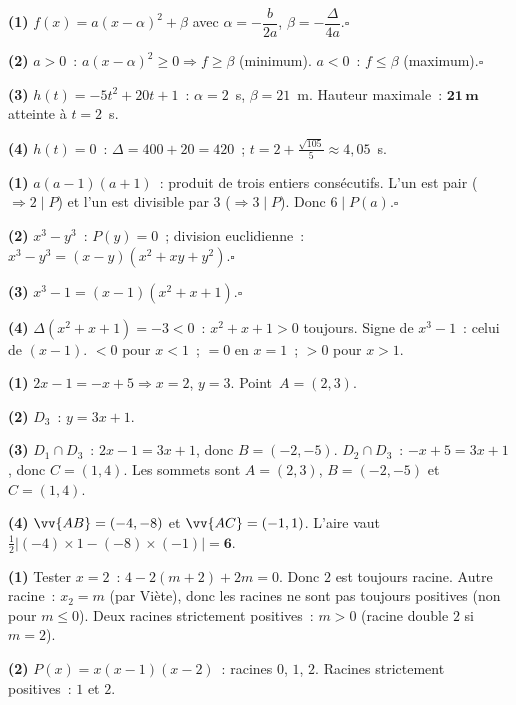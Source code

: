 \textbf{(1)} $f(x)=a(x-\alpha)^2+\beta$ avec $\alpha=-\dfrac{b}{2a}$, $\beta=-\dfrac{\Delta}{4a}$.\hfill$\square$

\textbf{(2)} $a>0$~: $a(x-\alpha)^2\geq0\Rightarrow f\geq\beta$ (minimum).
$a<0$~: $f\leq\beta$ (maximum).\hfill$\square$

\textbf{(3)} $h(t)=-5t^2+20t+1$~: $\alpha=2$~s, $\beta=21$~m.
Hauteur maximale~: $\mathbf{21\,\text{m}}$ atteinte \`a $t=2$~s.

\textbf{(4)} $h(t)=0$~: $\Delta=400+20=420$~;
$t=2+\tfrac{\sqrt{105}}{5}\approx4{,}05$~s.


\textbf{(1)} $a(a-1)(a+1)$~: produit de trois entiers cons\'ecutifs.
L'un est pair ($\Rightarrow2\mid P$) et l'un est divisible par $3$ ($\Rightarrow3\mid P$).
Donc $6\mid P(a)$.\hfill$\square$

\textbf{(2)} $x^3-y^3$~: $P(y)=0$~; division euclidienne~:
$x^3-y^3=(x-y)(x^2+xy+y^2)$.\hfill$\square$

\textbf{(3)} $x^3-1=(x-1)(x^2+x+1)$.\hfill$\square$

\textbf{(4)} $\Delta(x^2+x+1)=-3<0$~: $x^2+x+1>0$ toujours.
Signe de $x^3-1$~: celui de $(x-1)$.
$<0$ pour $x<1$~; $=0$ en $x=1$~; $>0$ pour $x>1$.


\textbf{(1)} $2x-1=-x+5\Rightarrow x=2$, $y=3$.
Point~$A=(2,3)$.

\textbf{(2)} $D_3$~: $y=3x+1$.

\textbf{(3)} $D_1\cap D_3$~: $2x-1=3x+1$, donc $B=(-2,-5)$.
$D_2\cap D_3$~: $-x+5=3x+1$, donc $C=(1,4)$.
Les sommets sont $A=(2,3)$, $B=(-2,-5)$ et $C=(1,4)$.

\textbf{(4)} $\vv{AB}=(-4,-8)$ et $\vv{AC}=(-1,1)$.
L'aire vaut $\frac12\left|(-4)\times1-(-8)\times(-1)\right|=\mathbf{6}$.


\textbf{(1)} Tester $x=2$~: $4-2(m+2)+2m=0$. Donc $2$ est toujours racine.
Autre racine~: $x_2=m$ (par Vi\`ete), donc les racines ne sont pas toujours positives (non pour $m\le0$).
Deux racines strictement positives~: $m>0$ (racine double $2$ si $m=2$).

\textbf{(2)} $P(x)=x(x-1)(x-2)$~: racines $0$, $1$, $2$.
Racines strictement positives~: $1$ et $2$.

